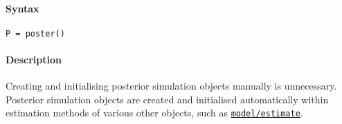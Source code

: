 


	\paragraph{Syntax}\label{syntax}

\begin{verbatim}
P = poster()
\end{verbatim}

\paragraph{Description}\label{description}

Creating and initialising posterior simulation objects manually is
unnecessary. Posterior simulation objects are created and initialised
automatically within estimation methods of various other objects, such
as \href{model/estimate}{\texttt{model/estimate}}.


